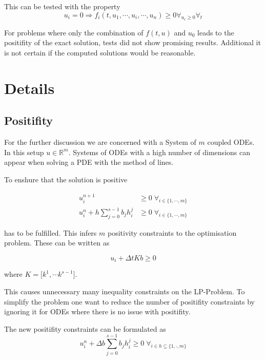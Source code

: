 \documentclass{article}
\begin{document}
This can be tested with the property 
\begin{equation}
u_i=0 \Rightarrow f_i(t,u_1,\cdots,u_i,\cdots,u_n) \geq 0  \forall_{u_c \geq 0} \forall_{t}
\end{equation}

For problems where only the combination of $f(t,u)$ and $u_0$ leads to the positifity of the exact solution, tests did not show promising results. Additional it is not certain if the computed solutions would be reasonable.

\section{Details}

\subsection{Positifity}

For the further discussion we are concerned with a System of $m$ coupled ODEs. 
In this setup  $u \in \mathbb{R}^m$.
Systems of ODEs with a high number of dimensions can appear when solving a PDE with the method of lines.

To enshure that the solution is positive 

\begin{align}
 u_i^{n+1} &\geq 0   \;   \forall_{i \in \{1, \cdots,m \}}  \\
 u_i^n + h \sum_{j=0}^{s-1} b_j h_i^j  &\geq 0   \;   \forall_{i \in \{1,\cdots,m \}}  
\end{align}

has to be fulfilled.
This infers $m$ positivity constraints to the optimisation problem. These can be written as

\begin{equation}
u_i + \Delta t K  b \geq 0     
\end{equation}

where $K = \big[k^1 , \cdots k^{s-1}\big]$.

This causes unnecessary many inequality constraints on the LP-Problem. To simplify the problem one want to reduce the number of positifity constraints by ignoring it for ODEs where there is no issue with positifity.

The new positifity constraints can be formulated as
\begin{equation}
u_i^n + \Delta b \sum_{j=0}^{s-1} b_j h_i^j  \geq 0   \;   \forall_{i \in h \subseteq \{1,\cdot,m \}} 
\end{equation}
\end{document}
